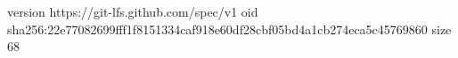 version https://git-lfs.github.com/spec/v1
oid sha256:22e77082699fff1f8151334caf918e60df28cbf05bd4a1cb274eca5c45769860
size 68
